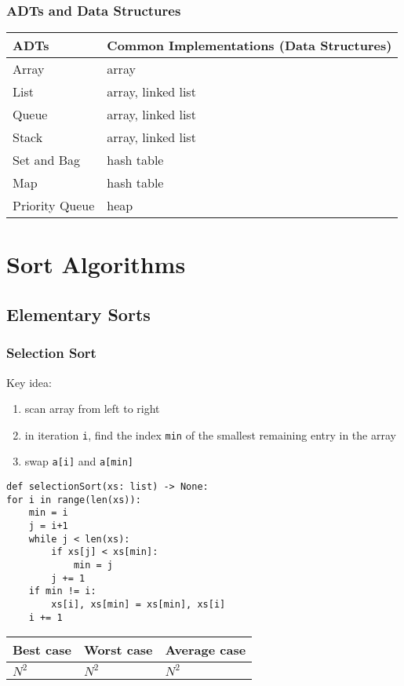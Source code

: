 \documentclass[a4paper]{article}
\begin{document}
\subsubsection*{ADTs and Data Structures}
\begin{spacing}{1.5}
\begin{tabularx}{1\textwidth}{X|p{}}
    \hline
    \textbf{ADTs} & \textbf{Common Implementations (Data Structures)}\\
    \hline
    Array&array\\
    List&array, linked list\\
    Queue&array, linked list\\
    Stack&array, linked list\\
    Set and Bag&hash table\\
    Map&hash table\\
    Priority Queue&heap\\
    \hline
\end{tabularx}
\end{spacing}


\section{Sort Algorithms}
\subsection{Elementary Sorts}
\subsubsection*{Selection Sort}
Key idea:
\begin{enumerate}
    \item scan array from left to right
    \item in iteration \verb|i|, find the index \verb|min| of the smallest remaining entry in the array
    \item swap \verb|a[i]| and \verb|a[min]|
\end{enumerate}
\begin{lstlisting}
def selectionSort(xs: list) -> None:
for i in range(len(xs)):
    min = i
    j = i+1
    while j < len(xs):
        if xs[j] < xs[min]:
            min = j
        j += 1
    if min != i:
        xs[i], xs[min] = xs[min], xs[i]
    i += 1
\end{lstlisting}
\begin{spacing}{1.5}
\begin{tabularx}{1\textwidth}{|X|X|X|}
    \hline
    \textbf{Best case} & \textbf{Worst case} & \textbf{Average case}\\
    \hline
    $N^2$&$N^2$&$N^2$\\
    \hline
\end{tabularx}
\end{spacing}
\end{document}
